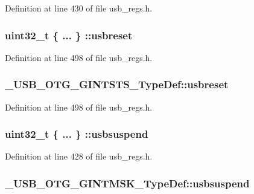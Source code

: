 Definition at line 430 of file usb\-\_\-regs.\-h.

\hypertarget{group___u_s_b___o_t_g___d_r_i_v_e_r_ga6124fb66ebbc8b96621e80c88ae8b6b4}{
\subsubsection[{usbreset}]{\setlength{\rightskip}{0pt plus 5cm}uint32\-\_\-t \{ ... \} \-::usbreset}}\label{group___u_s_b___o_t_g___d_r_i_v_e_r_ga6124fb66ebbc8b96621e80c88ae8b6b4}


Definition at line 498 of file usb\-\_\-regs.\-h.

\hypertarget{group___u_s_b___o_t_g___d_r_i_v_e_r_ga3aa72a4a2817c4f18026664ecc761887}{
\subsubsection[{usbreset}]{ \-\_\-\-U\-S\-B\-\_\-\-O\-T\-G\-\_\-\-G\-I\-N\-T\-S\-T\-S\-\_\-\-Type\-Def\-::usbreset}}\label{group___u_s_b___o_t_g___d_r_i_v_e_r_ga3aa72a4a2817c4f18026664ecc761887}


Definition at line 498 of file usb\-\_\-regs.\-h.

\hypertarget{group___u_s_b___o_t_g___d_r_i_v_e_r_ga4b74096d1d542697df7b8ed18d832755}{
\subsubsection[{usbsuspend}]{\setlength{\rightskip}{0pt plus 5cm}uint32\-\_\-t \{ ... \} \-::usbsuspend}}\label{group___u_s_b___o_t_g___d_r_i_v_e_r_ga4b74096d1d542697df7b8ed18d832755}


Definition at line 428 of file usb\-\_\-regs.\-h.

\hypertarget{group___u_s_b___o_t_g___d_r_i_v_e_r_ga661a2da9b63b983f395dce07f25c72bd}{
\subsubsection[{usbsuspend}]{ \-\_\-\-U\-S\-B\-\_\-\-O\-T\-G\-\_\-\-G\-I\-N\-T\-M\-S\-K\-\_\-\-Type\-Def\-::usbsuspend}}\label{group___u_s_b___o_t_g___d_r_i_v_e_r_ga661a2da9b63b983f395dce07f25c72bd}


